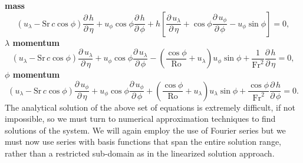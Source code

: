 {\bfseries mass}
\begin{equation}
\left(u_{\scriptscriptstyle \lambda}-\mathrm{Sr}\,c\cos\phi\right)\frac{\partial \, h}{\partial \, \eta} + u_{\scriptscriptstyle \phi}\cos\phi\frac{\partial \, h}{\partial \, \phi}+h\left[\frac{\partial \, u_{\scriptscriptstyle \lambda}}{\partial \, \eta}+\cos\phi\frac{\partial \, u_{\scriptscriptstyle \phi}}{\partial \, \phi}-u_{\scriptscriptstyle \phi}\sin\phi\right]=0, \label{eq:massincom2nonlin}
\end{equation}
{\bfseries \boldmath$\lambda$ momentum}
\begin{equation}
\left(u_{\scriptscriptstyle \lambda}-\mathrm{Sr}\,c\cos\phi\right)\frac{\partial \, u_{\scriptscriptstyle \lambda}}{\partial \, \eta} + u_{\scriptscriptstyle \phi}\cos\phi\frac{\partial \, u_{\scriptscriptstyle \lambda}}{\partial \, \phi} - \left(\frac{\cos\phi}{\mathrm{Ro}} + u_{\scriptscriptstyle \lambda}\right)u_{\scriptscriptstyle \phi}\sin\phi + \frac{1}{\mathrm{Fr}^2}\frac{\partial \, h}{\partial \, \eta} = 0, \label{eq:lamincom2nonlin}
\end{equation}
{\bfseries \boldmath$\phi$ momentum}
\begin{equation}
\left(u_{\scriptscriptstyle \lambda}-\mathrm{Sr}\,c\cos\phi\right)\frac{\partial \, u_{\scriptscriptstyle \phi}}{\partial \, \eta} + u_{\scriptscriptstyle \phi}\cos\phi\frac{\partial \, u_{\scriptscriptstyle \phi}}{\partial \, \phi} + \left(\frac{\cos\phi}{\mathrm{Ro}} + u_{\scriptscriptstyle \lambda} \right)u_{\scriptscriptstyle \lambda}\sin\phi + \frac{\cos\phi}{\mathrm{Fr}^2}\frac{\partial \, h}{\partial \, \phi} = 0. \label{eq:phiincom2nonlin}
\end{equation}
The analytical solution of the above set of equations is extremely difficult, if not impossible, so we must turn to numerical approximation techniques to find solutions of the system. We will again employ the use of Fourier series but we must now use series with basis functions that span the entire solution range, rather than a restricted sub-domain as in the linearized solution approach.

